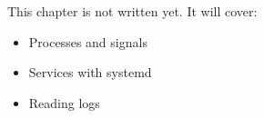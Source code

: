 \label{ch:linux4}
\begin{keyidea}
This chapter is not written yet. It will cover:
\begin{itemize}[nosep]
  \item Processes and signals
  \item Services with systemd
  \item Reading logs
\end{itemize}
\end{keyidea}
